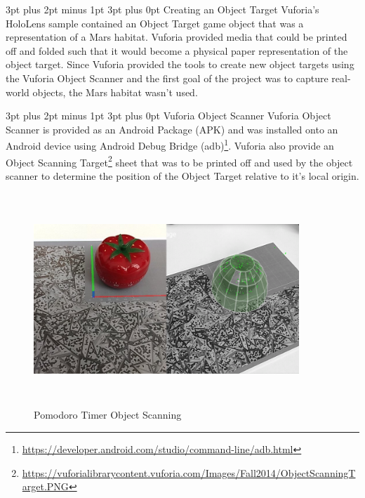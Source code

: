 \documentclass[12pt,a4paper,oneside]{article}
\makeatletter
\renewcommand\paragraph{\@startsection {paragraph}{1}{0mm} %
	                           {3pt plus 2pt minus 1pt} %
	                           {3pt plus 0pt} %
	                           {\normalfont}}
\makeatother
\begin{document}
\paragraph{Creating an Object Target}
Vuforia's HoloLens sample contained an Object Target game object that was a representation of a Mars habitat. Vuforia provided media that could be printed off and folded such that it would become a physical paper representation of the object target. Since Vuforia provided the tools to create new object targets using the Vuforia Object Scanner and the first goal of the project was to capture real-world objects, the Mars habitat wasn't used.

\paragraph{Vuforia Object Scanner}
Vuforia Object Scanner is provided as an Android Package (APK) and was installed onto an Android device using Android Debug Bridge (adb)\footnote{\url{https://developer.android.com/studio/command-line/adb.html}}. Vuforia also provide an Object Scanning Target\footnote{\url{https://vuforialibrarycontent.vuforia.com/Images/Fall2014/ObjectScanningTarget.PNG}} sheet that was to be printed off and used by the object scanner to determine the position of the Object Target relative to it's local origin.

\begin{figure}[!h]
	\centering
	\includegraphics[width=10cm,height=8cm,keepaspectratio]{images/pomo}
	\caption{Pomodoro Timer Object Scanning}
	\label{fig_pomo}
\end{figure}
\end{document}
